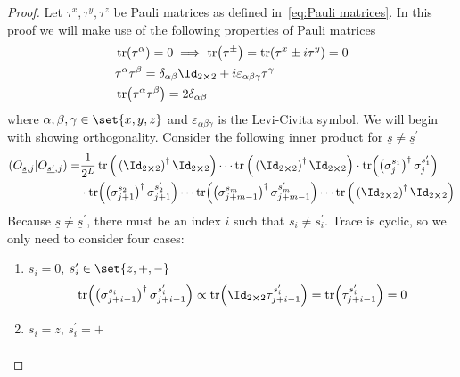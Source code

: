 \begin{proof}
    Let \(\tau^{x},\tau^{y},\tau^{z}\) be Pauli matrices as defined in~\eqref{eq:Pauli matrices}.
    In this proof we will make use of the following properties of Pauli matrices
    \begin{align}
        &\tr(\tau^{\alpha}) = 0 \implies \tr(\tau^{\pm}) = \tr(\tau^x \pm i \tau^y) = 0\label{eq:traceless}\\
        &\tau^{\alpha}\tau^{\beta} = \delta_{\alpha \beta} \Id_{2\cross 2} + i \varepsilon_{\alpha\beta\gamma}
         \tau^{\gamma}\label{eq:product}\\
        &\tr(\tau^{\alpha} \tau^{\beta}) = 2\delta_{\alpha\beta}\label{eq:product trace}
    \end{align}
    where \(\alpha,\beta,\gamma \in \set{x,y,z}\) and \(\varepsilon_{\alpha\beta\gamma}\) is the Levi-Civita
    symbol.
    We will begin with showing orthogonality. Consider the following inner product for 
    \(\underline{s}\neq \underline{s}^{\prime}\)
    \begin{align}
    \hs{O_{\underline{s},j}}{O_{\underline{s^{\prime}},j}} =& \frac{1}{2^L} 
    \tr\Big(\left(\Id_{2\cross 2}\right)^{\dagger}\Id_{2\cross 2}\Big) \cdots 
    \tr\Big(\left(\Id_{2\cross 2}\right)^{\dagger}\Id_{2\cross 2}\Big)
    \cdot \tr(\left(\sigma_j^{s_1}\right)^{\dagger} \sigma_j^{s_1^{\prime}})\nonumber\\ 
    &\cdot \tr(\left(\sigma_{j+1}^{s_2}\right)^{\dagger} \sigma_{j+1}^{s_2^{\prime}})
    \cdots \tr(\left(\sigma_{j+m-1}^{s_m}\right)^{\dagger} \sigma_{j+m-1}^{s_m^{\prime}}) \cdots 
    \tr\Big(\left(\Id_{2\cross 2}\right)^{\dagger}\Id_{2\cross 2}\Big)
    \label{eq:orthogonality proof fragment}
    \end{align}
    Because \(\underline{s}\neq \underline{s}^{\prime}\), there must be an index \(i\) such that
    \(s_i\neq s_i^{\prime}\). Trace is cyclic, so we only need to consider four cases:
    \begin{enumerate}
        \item {\(s_i = 0\), \(s_i^{\prime} \in \set{z,+,-}\)
        \begin{align*}
            \tr(\left(\sigma^{s_i}_{j+i-1}\right)^{\dagger} \sigma^{s_i^{\prime}}_{j+i-1}) \propto
            \tr(\Id_{2\cross 2 }\tau^{s_i^{\prime}}_{j+i-1}) =
            \tr(\tau^{s_i^{\prime}}_{j+i-1})  = 0
        \end{align*}
        }
        \item { \(s_i = z\), \(s_i^{\prime} = +\)
        \begin{align*}

\end{align*}}
\end{enumerate}
\end{proof}
